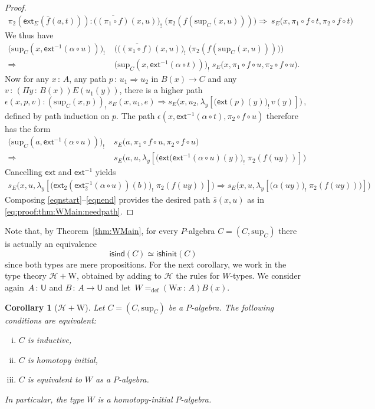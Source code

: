 \documentclass[10pt,a4paper,oneside,reqno]{amsart}
\numberwithin{equation}{section}
\theoremstyle{mythm}
\newtheorem{corollary}[theorem]{Corollary}
\theoremstyle{mydef}
\theoremstyle{myrmk}
\newcommand{\defeq}{=_{\mathrm{def}}}
\newcommand{\co}{\,{:}\,}
\newcommand{\com}{\circ}
\newcommand{\Hint}{\mathcal{H}}
\newcommand{\isalgind}{\mathsf{isind}}
\newcommand{\isalghinit}{\mathsf{ishinit}}
\newcommand{\ext}{\mathsf{ext}}
\newcommand{\lam}[1]{\lambda_{#1}}
\newcommand{\W}{\mathrm{W}}
\newcommand{\U}{\mathsf{U}}
\renewcommand{\sup}{\mathrm{sup}}
\begin{document}
\begin{proof}
\begin{align*}
\pi_2(\ext_\Sigma(\bar{f}(a,t))) : \big(\overline{(\pi_1 \com f)}(x,u)\big)_{!} \; \big(\pi_2(f (\sup_C(x,u))) \big)
\Rightarrow\ s_E\big(x,\pi_1 \circ f \circ t, \pi_2 \circ f \circ t\big)
\end{align*}
We thus have
\begin{align*}
\big(\sup_C(x,\ext^{-1}(\alpha \circ u))\big)_{!} \;& \big( \big(\overline{(\pi_1 \com f)}(x,u)\big)_{!} \; \big(\pi_2 (f (\sup_C(x,u))) \big) \big) \\
\Rightarrow\ &\big(\sup_C(x,\ext^{-1}(\alpha \circ t))\big)_{!} \; s_E\big(x,\pi_1 \circ f \circ u, \pi_2 \circ f \circ u\big).
\end{align*}
%
Now for any $x \co A$, any path $p \co u_1 \Rightarrow u_2$ in $B(x) \to C$ and any 
$v \co (\Pi y \co B(x))E(u_1(y))$, there is a higher path 
\[ 
\epsilon(x,p,v) : (\sup_C(x,p))_{!}\, s_E(x,u_1,e) \Rightarrow s_E\big(x,u_2, \lam{y} [\big(\ext(p)(y)\big)_{!}\, v(y)]\big)\,, 
\]
defined by path induction on $p$.
The path $\epsilon(x,\ext^{-1}(\alpha \circ t),\pi_2 \circ f \circ u)$ therefore has the form
\begin{align*}
\big(\sup_C(a,\ext^{-1}(\alpha \circ u))\big)_{!} \; &s_E\big(a,\pi_1 \circ f \circ u , \pi_2 \circ f \circ u \big)\\
\Rightarrow\ & s_E\big(a, u , \lam{y}[ \big(\ext(\ext^{-1}(\alpha \circ u)(y)\big)_{!} \; \pi_2(f(u y))]\big)
\end{align*}
Cancelling $\ext$ and $\ext^{-1}$  yields
\begin{align}
s_E\big(x,u, \lam{y}[ \big(\ext_2(\ext^{-1}_2(\alpha \circ u))(b)\big)_{!} \; \pi_2(f(u y))]\big) \Rightarrow 
s_E\big(x,u , \lam{y}[ \big(\alpha(u y )\big)_{!} \; \pi_2(f(u y )))]\big)
 \label{eqnend}
\end{align}
Composing \eqref{eqnstart}--\eqref{eqnend} provides the desired path $\bar{s}(x,u)$ as in \eqref{eq:proof:thm:WMain:needpath}.
\end{proof}



Note that, by Theorem~\ref{thm:WMain}, for every $P$-algebra $C = (C, \sup_C)$ there is actually an equivalence 
\[
\isalgind(C) \simeq \isalghinit(C)
\]
since both types are mere propositions.  For the next corollary, we work in the type theory $\Hint + \W$, obtained by adding to $\Hint$ the rules for $W$-types.
We consider again~$A \co \U$ and $B \co A \to \U$ and let~$W \defeq (\W x \co A) B(x)$.

\begin{corollary}[$\Hint + \W$]
\label{lem:WInitInt} Let $C = (C, \sup_C)$ be a $P$-algebra. The following conditions are
equivalent:
\begin{enumerate}[(i)]
\item $C$ is inductive,
\item $C$ is homotopy initial,
\item $C$ is equivalent to $W$ as a $P$-algebra.
\end{enumerate}
In particular, the type $W$ is a homotopy-initial $P$-algebra.
\end{corollary}
\end{document}
